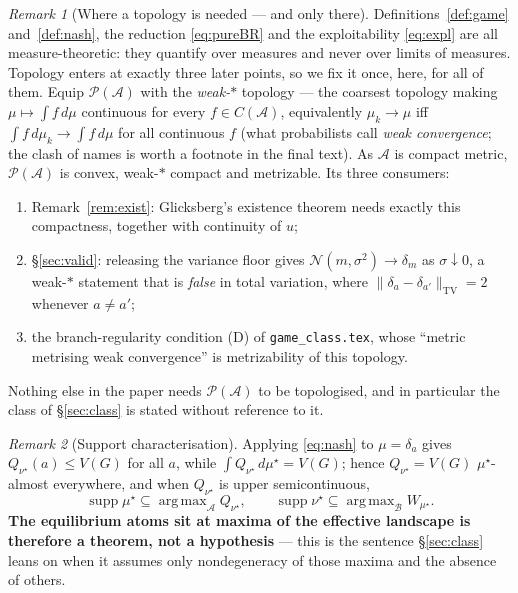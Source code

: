 \documentclass[11pt]{article}
\theoremstyle{definition}
\theoremstyle{remark}
\newtheorem{remark}{Remark}
\newcommand{\cA}{\mathcal{A}}
\newcommand{\cB}{\mathcal{B}}
\newcommand{\cP}{\mathcal{P}}
\newcommand{\cN}{\mathcal{N}}
\DeclareMathOperator*{\argmax}{arg\,max}
\DeclareMathOperator{\supp}{supp}
\begin{document}
\begin{remark}[Where a topology is needed --- and only there]\label{rem:weakstar}
Definitions~\ref{def:game} and~\ref{def:nash}, the reduction \eqref{eq:pureBR}
and the exploitability \eqref{eq:expl} are all measure-theoretic: they quantify
over measures and never over limits of measures. Topology enters at exactly
three later points, so we fix it once, here, for all of them. Equip $\cP(\cA)$
with the \emph{weak-$*$} topology --- the coarsest topology making
$\mu \mapsto \int f\,d\mu$ continuous for every $f \in C(\cA)$, equivalently
$\mu_k \to \mu$ iff $\int f\,d\mu_k \to \int f\,d\mu$ for all continuous $f$
(what probabilists call \emph{weak convergence}; the clash of names is worth a
footnote in the final text). As $\cA$ is compact metric, $\cP(\cA)$ is convex,
weak-$*$ compact and metrizable. Its three consumers:
\begin{enumerate}[label=(\roman*), leftmargin=2.2em, itemsep=1pt]
\item Remark~\ref{rem:exist}: Glicksberg's existence theorem needs exactly this
  compactness, together with continuity of $u$;
\item \S\ref{sec:valid}: releasing the variance floor gives
  $\cN(m,\sigma^2) \to \delta_m$ as $\sigma \downarrow 0$, a weak-$*$ statement
  that is \emph{false} in total variation, where
  $\|\delta_a - \delta_{a'}\|_{\mathrm{TV}} = 2$ whenever $a \ne a'$;
\item the branch-regularity condition (D) of \texttt{game\_class.tex}, whose
  ``metric metrising weak convergence'' is metrizability of this topology.
\end{enumerate}
Nothing else in the paper needs $\cP(\cA)$ to be topologised, and in particular
the class of \S\ref{sec:class} is stated without reference to it.
\end{remark}

\begin{remark}[Support characterisation]\label{rem:bg-support}
Applying \eqref{eq:nash} to $\mu = \delta_a$ gives $Q_{\nu^\star}(a) \le V(G)$
for all $a$, while $\int Q_{\nu^\star}\,d\mu^\star = V(G)$; hence
$Q_{\nu^\star} = V(G)$ $\mu^\star$-almost everywhere, and when $Q_{\nu^\star}$ is
upper semicontinuous,
\[
  \supp \mu^\star \subseteq \argmax_{\cA} Q_{\nu^\star},
  \qquad
  \supp \nu^\star \subseteq \argmax_{\cB} W_{\mu^\star}.
\]
\textbf{The equilibrium atoms sit at maxima of the effective landscape is
therefore a theorem, not a hypothesis} --- this is the sentence \S\ref{sec:class}
leans on when it assumes only nondegeneracy of those maxima and the absence of
others.
\end{remark}
\end{document}
